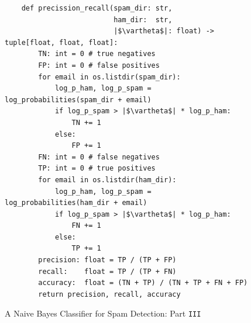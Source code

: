 \begin{figure}[!ht]
\centering
\begin{verbatim}
    def precission_recall(spam_dir: str,
                          ham_dir:  str,
                          |$\vartheta$|: float) -> tuple[float, float, float]:
        TN: int = 0 # true negatives
        FP: int = 0 # false positives
        for email in os.listdir(spam_dir):
            log_p_ham, log_p_spam = log_probabilities(spam_dir + email)
            if log_p_spam > |$\vartheta$| * log_p_ham:
                TN += 1
            else:
                FP += 1
        FN: int = 0 # false negatives
        TP: int = 0 # true positives
        for email in os.listdir(ham_dir):
            log_p_ham, log_p_spam = log_probabilities(ham_dir + email)
            if log_p_spam > |$\vartheta$| * log_p_ham:
                FN += 1
            else:
                TP += 1
        precision: float = TP / (TP + FP)
        recall:    float = TP / (TP + FN)
        accuracy:  float = (TN + TP) / (TN + TP + FN + FP)
        return precision, recall, accuracy
\end{verbatim}
\caption{A Naive Bayes Classifier for Spam Detection: Part \texttt{III}}
\label{fig:Spam-Detection.ipynb-4}
\end{figure}



